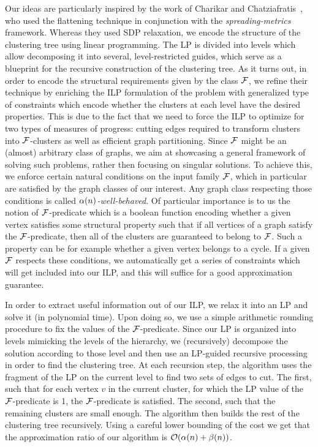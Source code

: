 Our ideas are particularly inspired by the work of Charikar and Chatziafratis~\cite{ApproximateHierarchicalClusteringViaSparsestCutAndSpreadingMetrics}, who used the flattening technique in conjunction with the \emph{spreading-metrics} framework. Whereas they used SDP relaxation, we encode the structure of the clustering tree using linear programming. The LP is divided into levels which allow decomposing it into several, level-restricted guides, which serve as a blueprint for the recursive construction of the clustering tree.
As it turns out, in order to encode the structural requirements given by the class $\mathcal{F}$, we refine their technique by enriching the ILP formulation of the problem with generalized type of constraints which encode whether the clusters at each level have the desired properties. This is due to the fact that we need to force the ILP to optimize for two types of measures of progress: cutting edges required to transform clusters into $\mathcal{F}$-clusters as well as efficient graph partitioning. Since $\mathcal{F}$ might be an (almost) arbitrary class of graphs, we aim at showcasing a general framework of solving such problems, rather then focusing on singular solutions. To achieve this, we enforce certain natural conditions on the input family $\mathcal{F}$, which in particular are satisfied by the graph classes of our interest. Any graph class respecting those conditions is called \emph{$\alpha\mathopen{}\left( n \right)$-well-behaved}. Of particular importance is to us the notion of $\mathcal{F}$-predicate which is a boolean function encoding whether a given vertex satisfies some structural property such that if all vertices of a graph satisfy the $\mathcal{F}$-predicate, then all of the clusters are guaranteed to belong to $\mathcal{F}$. Such a property can be for example whether a given vertex belongs to a cycle. If a given $\mathcal{F}$ respects these conditions, we automatically get a series of constraints which will get included into our ILP, and this will suffice for a good approximation guarantee.

In order to extract useful information out of our ILP, we relax it into an LP and solve it (in polynomial time). Upon doing so, we use a simple arithmetic rounding procedure to fix the values of the $\mathcal{F}$-predicate. Since our LP is organized into levels mimicking the levels of the hierarchy, we (recursively) decompose the solution according to those level and then use an LP-guided recursive processing in order to find the clustering tree.
At each recursion step, the algorithm uses the fragment of the LP on the current level to find two sets of edges to cut. The first, such that for each vertex $v$ in the current cluster, for which the LP value of the $\mathcal{F}$-predicate is 1, the $\mathcal{F}$-predicate is satisfied. The second, such that the remaining clusters are small enough. The algorithm then builds the rest of the clustering tree recursively. Using a careful lower bounding of the cost we get that the approximation ratio of our algorithm is $\mathcal{O}\mathopen{}\left( \alpha\mathopen{}\left( n \right)+\beta\mathopen{}\left( n \right) \right)$.

